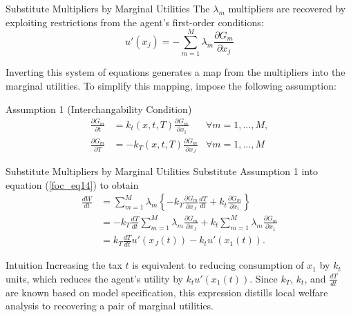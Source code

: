 \documentclass{beamer}
\begin{document}
\begin{frame}{Substitute Multipliers by Marginal Utilities}
	The $\lambda_m$ multipliers are recovered by exploiting restrictions from the agent’s first-order conditions:
	\begin{equation}\nonumber
		u'(x_j) = -\sum_{m=1}^M\lambda_m\frac{\partial G_m}{\partial x_j}
	\end{equation}

	Inverting this system of equations generates a map from the multipliers into the marginal utilities. To simplify this mapping, impose the following assumption:
	\begin{block}{Assumption 1 (Interchangability Condition)}
		\begin{equation}\label{assumption1}\nonumber
			\begin{aligned}
				\frac{\partial G_m}{\partial t} &= k_t(x,t,T)\frac{\partial G_m}{\partial x_1} &\forall m=1,...,M, \\
				\frac{\partial G_m}{\partial T} &= -k_T(x,t,T)\frac{\partial G_m}{\partial x_J} &\forall m=1,...,M
			\end{aligned}
		\end{equation}
	\end{block}
\end{frame}
\begin{frame}{Substitute Multipliers by Marginal Utilities}
	Substitute Assumption 1 into equation (\ref{foc_eq14}) to obtain
	\begin{equation}
		\begin{aligned}
			\frac{dW}{dt} &= \sum_{m=1}^M\lambda_m\left\{-k_T\frac{\partial G_m}{\partial x_J}\frac{dT}{dt} + k_t\frac{\partial G_m}{\partial x_1}\right\} \\
			&= -k_T\frac{dT}{dt}\sum_{m=1}^M\lambda_m\frac{\partial G_m}{\partial x_J} + k_t\sum_{m=1}^M\lambda_m\frac{\partial G_m}{\partial x_1} \\
			&= k_T\frac{dT}{dt}u'(x_J(t)) - k_tu'(x_1(t)).
		\end{aligned}
	\end{equation}

	\begin{block}{Intuition}
		Increasing the tax $t$ is equivalent to reducing consumption of $x_1$ by $k_t$ units, which reduces the agent’s utility by $k_tu'(x_1(t))$. Since $k_T$, $k_t$, and $\frac{dT}{dt}$ are known based on model specification, this expression distills local welfare analysis to recovering a pair of marginal utilities.
	\end{block}
\end{frame}
\end{document}
